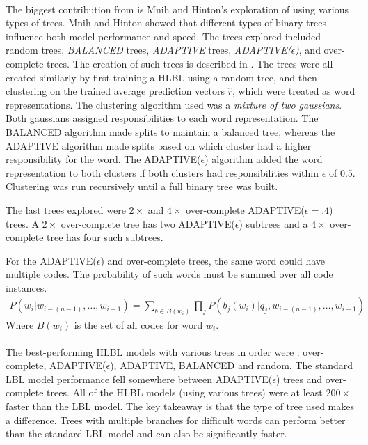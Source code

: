 \paragraph{}
The biggest contribution from \cite{MnihHinton2009} is  Mnih and Hinton's exploration of using various types of trees. Mnih and Hinton showed that different types of binary trees influence both model performance and speed. The trees explored included random trees, \emph{BALANCED} trees, \emph{ADAPTIVE} trees, \emph{ADAPTIVE($\epsilon$)}, and over-complete trees. The creation of such trees is described in \cite{MnihHinton2009}.
The trees were all created similarly by first training a HLBL using a random tree, and then clustering on the trained average prediction vectors $\bar{\hat{r}}$, which were treated as word representations. The clustering algorithm used was a \emph{mixture of two gaussians}. Both gaussians assigned responsibilities to each word representation. The BALANCED algorithm made splits to maintain a balanced tree, whereas the ADAPTIVE algorithm made splits based on which cluster had a higher responsibility for the word. The ADAPTIVE($\epsilon$) algorithm added the word representation to both clusters if both clusters had responsibilities within $\epsilon$ of 0.5. Clustering was run recursively until a full binary tree was built. 

The last trees explored were $2\times$ and $4\times$ over-complete ADAPTIVE($\epsilon=.4$) trees. A $2 \times$ over-complete tree has two ADAPTIVE($\epsilon$) subtrees and a $4\times$ over-complete tree has four such subtrees. 

For the ADAPTIVE($\epsilon$) and over-complete trees, the same word could have multiple codes. The probability of such words must be summed over all code instances.
\begin{align}
P(w_i | w_{i-(n-1)},\dots, w_{i-1}) = \sum_{b \in B(w_i)} \prod_j P(b_j(w_i) | q_j, w_{i-(n-1)},\dots, w_{i-1})
\end{align}
Where $B(w_i)$ is the set of all codes for word $w_i$.

\paragraph{}
The best-performing HLBL models with various trees in order were : over-complete, ADAPTIVE($\epsilon$), ADAPTIVE, BALANCED and random. The standard LBL model performance fell somewhere between ADAPTIVE($\epsilon$) trees and over-complete trees. All of the HLBL models (using various trees) were at least $200\times$ faster than the LBL model. 
The key takeaway is that the type of tree used makes a difference. Trees with multiple branches for difficult words can perform better than the standard LBL model and can also be significantly faster.

